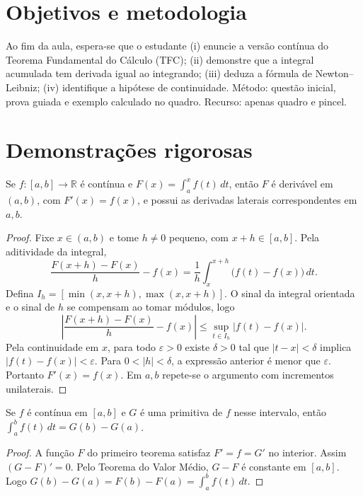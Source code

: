 \documentclass[11pt,a4paper]{article}
\begin{document}
\section{Objetivos e metodologia}
Ao fim da aula, espera-se que o estudante (i) enuncie a versão contínua do Teorema Fundamental do Cálculo (TFC); (ii) demonstre que a integral acumulada tem derivada igual ao integrando; (iii) deduza a fórmula de Newton--Leibniz; (iv) identifique a hipótese de continuidade. Método: questão inicial, prova guiada e exemplo calculado no quadro. Recurso: apenas quadro e pincel.
\section{Demonstrações rigorosas}
\begin{teorema}
Se $f:[a,b]\to\mathbb R$ é contínua e $F(x)=\int_a^x f(t)\,dt$, então $F$ é derivável em $(a,b)$, com $F'(x)=f(x)$, e possui as derivadas laterais correspondentes em $a,b$.
\end{teorema}
\begin{proof}
Fixe $x\in(a,b)$ e tome $h\neq0$ pequeno, com $x+h\in[a,b]$. Pela aditividade da integral,
\[
\frac{F(x+h)-F(x)}{h}-f(x)
=\frac1h\int_x^{x+h}\bigl(f(t)-f(x)\bigr)\,dt.
\]
Defina $I_h=[\min(x,x+h),\max(x,x+h)]$. O sinal da integral orientada e o sinal de $h$ se compensam ao tomar módulos, logo
\[
\left|\frac{F(x+h)-F(x)}h-f(x)\right|
\le \sup_{t\in I_h}|f(t)-f(x)|.
\]
Pela continuidade em $x$, para todo $\varepsilon>0$ existe $\delta>0$ tal que $|t-x|<\delta$ implica $|f(t)-f(x)|<\varepsilon$. Para $0<|h|<\delta$, a expressão anterior é menor que $\varepsilon$. Portanto $F'(x)=f(x)$. Em $a,b$ repete-se o argumento com incrementos unilaterais.
\end{proof}
\begin{teorema}
Se $f$ é contínua em $[a,b]$ e $G$ é uma primitiva de $f$ nesse intervalo, então $\int_a^b f(t)\,dt=G(b)-G(a)$.
\end{teorema}
\begin{proof}
A função $F$ do primeiro teorema satisfaz $F'=f=G'$ no interior. Assim $(G-F)'=0$. Pelo Teorema do Valor Médio, $G-F$ é constante em $[a,b]$. Logo $G(b)-G(a)=F(b)-F(a)=\int_a^b f(t)\,dt$.
\end{proof}
\end{document}
